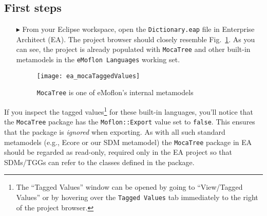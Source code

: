 \newpage
\hypertarget{initialize vis}{}
\subsection{First steps}
\visHeader

\begin{itemize}

\item[$\blacktriangleright$] From your Eclipse workspace, open the \texttt{Dict\-ion\-ary.eap} file in Enterprise Architect (EA). The project browser should
closely resemble Fig.~\ref{ea:mocaTagged}. As you can see, the project is already populated with \texttt{MocaTree} and other built-in metamodels
in the \texttt{eMoflon Languages} working set.

\vspace{0.5cm}

\begin{figure}[htpb]
\begin{center}
  \texttt{[image: ea\_mocaTaggedValues]}
  \caption{\texttt{MocaTree} is one of eMoflon's internal metamodels}
  \label{ea:mocaTagged}
\end{center}
\end{figure}

\end{itemize}

\vspace{-0.5cm}

If you inspect the tagged values\footnote{The ``Tagged Values'' window can be opened by going to ``View/Tagged Values'' or by hovering over the \texttt{Tagged
Values} tab immediately to the right of the project browser.} for these built-in languages, you'll notice that the \texttt{MocaTree} package has the
\texttt{Moflon::Export} value set to \texttt{false}. This ensures that the package is \emph{ignored} when exporting. As with all such standard metamodels (e.g.,
Ecore or our SDM metamodel) the \texttt{MocaTree} package in EA should be regarded as read-only, required only in the EA project so that SDMs/TGGs can refer to
the classes defined in the package.

